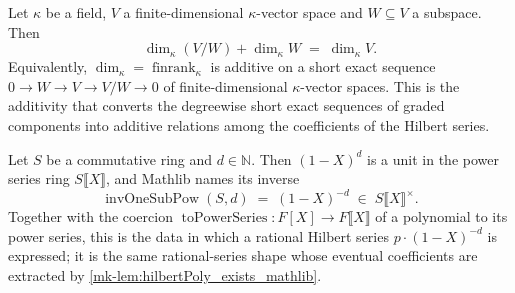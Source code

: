 \begin{lemma}
  \label{mk-lem:finrank_ses_additive_mathlib}
  \mathlibok

  Let \(\kappa\) be a field, \(V\) a finite-dimensional \(\kappa\)-vector space and
  \(W \subseteq V\) a subspace. Then
  \[
    \dim_\kappa (V / W) + \dim_\kappa W \;=\; \dim_\kappa V .
  \]
  Equivalently, \(\dim_\kappa = \operatorname{finrank}_\kappa\) is additive on a
  short exact sequence \(0 \to W \to V \to V/W \to 0\) of finite-dimensional
  \(\kappa\)-vector spaces. This is the additivity that converts the degreewise
  short exact sequences of graded components into additive relations among the
  coefficients of the Hilbert series.
\end{lemma}

\begin{lemma}
  \label{mk-lem:invOneSubPow_mathlib}
  \mathlibok

  Let \(S\) be a commutative ring and \(d \in \mathbb{N}\). Then \((1 - X)^d\) is a
  unit in the power series ring \(S\llbracket X\rrbracket\), and Mathlib names its
  inverse
  \[
    \operatorname{invOneSubPow}(S, d) \;=\; (1 - X)^{-d}
      \;\in\; S\llbracket X\rrbracket^{\times}.
  \]
  Together with the coercion
  \(\operatorname{toPowerSeries} : F[X] \to F\llbracket X\rrbracket\) of a
  polynomial to its power series, this is the data in which a rational Hilbert
  series \(p \cdot (1 - X)^{-d}\) is expressed; it is the same rational-series shape
  whose eventual coefficients are extracted by
  \ref{mk-lem:hilbertPoly_exists_mathlib}.
\end{lemma}

